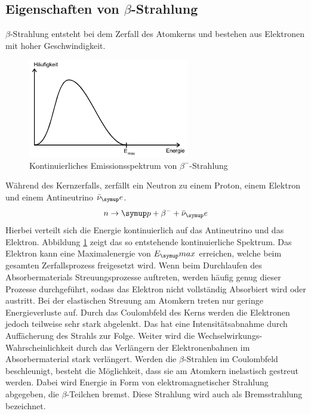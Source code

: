 \subsection{Eigenschaften von \texorpdfstring{$\beta$}{beta}-Strahlung}
$\beta$-Strahlung entsteht bei dem Zerfall des Atomkerns und bestehen aus
Elektronen mit hoher Geschwindigkeit.
\begin{figure}
  \includegraphics[width=7cm]{bilder/emissionbeta.jpg}
  \caption{Kontinuierliches Emissionsspektrum von $\beta^-$-Strahlung}
  \label{fig:emib}
\end{figure}
Während des Kernzerfalls, zerfällt ein Neutron zu einem Proton, einem Elektron
und einem Antineutrino $\bar\nu_\su{e}$.
\begin{equation*}
  n \rightarrow \su{p + \beta^- + \bar\nu_\su{e}}
\end{equation*}
Hierbei verteilt sich die Energie kontinuierlich auf das Antineutrino und das
Elektron. Abbildung \ref{fig:emib} zeigt das so entstehende kontinuierliche Spektrum.
Das Elektron kann eine Maximalenergie von $E_\su{max}$ erreichen, welche beim
gesamten Zerfallsprozess freigesetzt wird.
Wenn beim Durchlaufen des Absorbermaterials Streuungsprozesse auftreten, werden
häufig genug dieser Prozesse durchgeführt, sodass das Elektron nicht vollständig
Absorbiert wird oder austritt.
Bei der elastischen Streuung am Atomkern treten nur geringe Energieverluste auf.
Durch das Coulombfeld des Kerns werden die Elektronen jedoch teilweise sehr stark
abgelenkt. Das hat eine Intensitätsabnahme durch Auffächerung des Strahls zur Folge.
Weiter wird die Wechselwirkungs-Wahrscheinlichkeit durch das Verlängern der
Elektronenbahnen im Absorbermaterial stark verlängert.
Werden die $\beta$-Strahlen im Coulombfeld beschleunigt, besteht die Möglichkeit,
dass sie am Atomkern inelastisch gestreut werden. Dabei wird Energie in Form
von elektromagnetischer Strahlung abgegeben, die $\beta$-Teilchen bremst. Diese
Strahlung wird auch als Bremsstrahlung bezeichnet.

